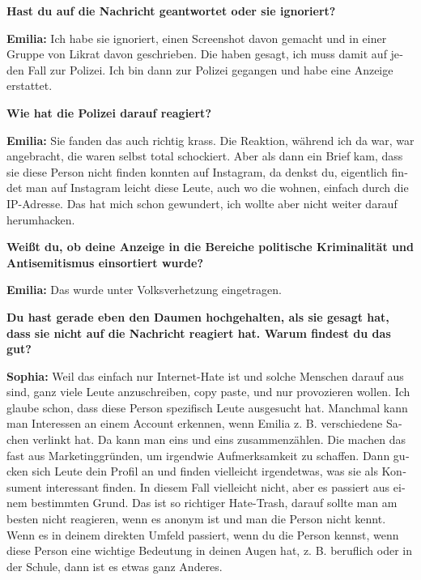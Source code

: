 \begin{otherlanguage}{ngerman}
\textbf{Hast du auf die Nachricht geantwortet oder sie ignoriert?}  

\textbf{Emilia:} Ich habe sie ignoriert, einen Screenshot davon gemacht und in einer Gruppe von Likrat davon geschrieben. Die haben gesagt, ich muss damit auf jeden Fall zur Polizei. Ich bin dann zur Polizei gegangen und habe eine Anzeige erstattet. 

\textbf{Wie hat die Polizei darauf reagiert?}  

\textbf{Emilia:} Sie fanden das auch richtig krass. Die Reaktion, während ich da war, war angebracht, die waren selbst total schockiert. Aber als dann ein Brief kam, dass sie diese Person nicht finden konnten auf Instagram, da denkst du, eigentlich findet man auf Instagram leicht diese Leute, auch wo die wohnen, einfach durch die IP-Adresse. Das hat mich schon gewundert, ich wollte aber nicht weiter darauf herumhacken. 

\textbf{Weißt du, ob deine Anzeige in die Bereiche politische Kriminalität und Antisemitismus einsortiert wurde?} 

\textbf{Emilia:} Das wurde unter Volksverhetzung eingetragen. 

\textbf{Du hast gerade eben den Daumen hochgehalten, als sie gesagt hat, dass sie nicht auf die Nachricht reagiert hat. Warum findest du das gut?} 

\textbf{Sophia:} Weil das einfach nur Internet-Hate ist und solche Menschen darauf aus sind, ganz viele Leute anzuschreiben, copy paste, und nur provozieren wollen. Ich glaube schon, dass diese Person spezifisch Leute ausgesucht hat. Manchmal kann man Interessen an einem Account erkennen, wenn Emilia z. B. verschiedene Sachen verlinkt hat. Da kann man eins und eins zusammenzählen. Die machen das fast aus Marketinggründen, um irgendwie Aufmerksamkeit zu schaffen. Dann gucken sich Leute dein Profil an und finden vielleicht irgendetwas, was sie als Konsument interessant finden. In diesem Fall vielleicht nicht, aber es passiert aus einem bestimmten Grund. Das ist so richtiger Hate-Trash, darauf sollte man am besten nicht reagieren, wenn es anonym ist und man die Person nicht kennt. Wenn es in deinem direkten Umfeld passiert, wenn du die Person kennst, wenn diese Person eine wichtige Bedeutung in deinen Augen hat, z. B. beruflich oder in der Schule, dann ist es etwas ganz Anderes. 


\end{otherlanguage}
